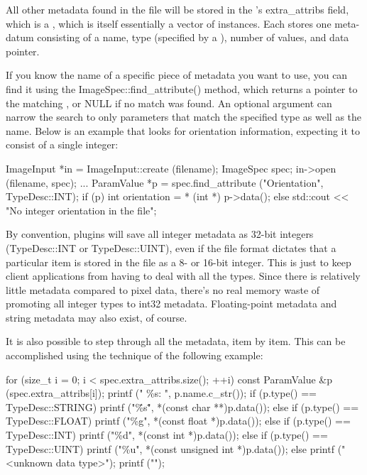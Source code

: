 All other metadata found in the file will be stored in the
\ImageSpec's {\cf extra_attribs} field, which is a 
\ParamValueList, which is itself essentially a vector of
\ParamValue instances.  Each \ParamValue
stores one meta-datum consisting of a name, type (specified by 
a \TypeDesc), number of values, and data pointer.

If you know the name of a specific piece of metadata you want to use,
you can find it using the {\cf ImageSpec::find_attribute()}
method, which returns a pointer to the matching \ParamValue,
or {\cf NULL} if no match was found.  An optional \TypeDesc
argument can narrow the search to only parameters that match the
specified type as well as the name.  Below is an
example that looks for orientation information, expecting it to consist 
of a single integer:

\begin{code}
        ImageInput *in = ImageInput::create (filename);
        ImageSpec spec;
        in->open (filename, spec);
        ...
        ParamValue *p = spec.find_attribute ("Orientation", TypeDesc::INT);
        if (p) {
            int orientation = * (int *) p->data();
        } else {
            std::cout << "No integer orientation in the file\n";
        }
\end{code}

By convention, \ImageInput plugins will save all integer metadata as
32-bit integers ({\cf TypeDesc::INT} or {\cf TypeDesc::UINT}), even if the file format
dictates that a particular item is stored in the file as a 8- or 16-bit
integer.  This is just to keep client applications from having to deal
with all the types.  Since there is relatively little metadata compared
to pixel data, there's no real memory waste of promoting all integer
types to int32 metadata.  Floating-point metadata and string metadata
may also exist, of course.

It is also possible to step through all the metadata, item by item.
This can be accomplished using the technique of the following example:

\begin{code}
        for (size_t i = 0;  i < spec.extra_attribs.size();  ++i) {
            const ParamValue &p (spec.extra_attribs[i]);
            printf ("    \%s: ", p.name.c_str());
            if (p.type() == TypeDesc::STRING)
                printf ("\"\%s\"", *(const char **)p.data());
            else if (p.type() == TypeDesc::FLOAT)
                printf ("\%g", *(const float *)p.data());
            else if (p.type() == TypeDesc::INT)
                printf ("\%d", *(const int *)p.data());
            else if (p.type() == TypeDesc::UINT)
                printf ("\%u", *(const unsigned int *)p.data());
            else
                printf ("<unknown data type>");
            printf ("\n");
        }
\end{code}

